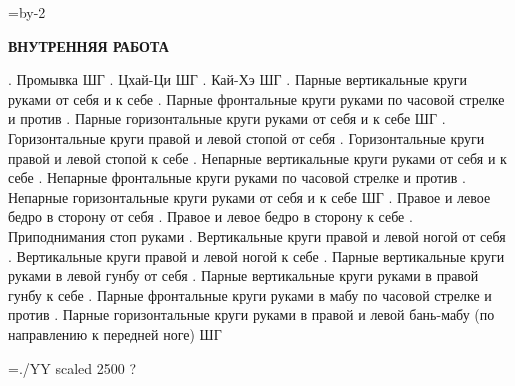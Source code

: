 \pdfhorigin=19mm \hsize=\pdfpagewidth \advance\hsize by-2\pdfhorigin
\nopagenumbers
\centerline{\bf ВНУТРЕННЯЯ РАБОТА}
\bigskip
\obeylines
\leavevmode{}. Промывка
ШГ
\leavevmode{}. Цхай-Ци
ШГ
\leavevmode{}. Кай-Хэ
ШГ
\leavevmode{}. Парные вертикальные круги руками от себя и к себе
\leavevmode{}. Парные фронтальные круги руками по часовой стрелке и против
\leavevmode{}. Парные горизонтальные круги руками от себя и к себе
ШГ
\leavevmode{}. Горизонтальные круги правой и левой стопой от себя
\leavevmode{}. Горизонтальные круги правой и левой стопой к себе
\leavevmode{}. Непарные вертикальные круги руками от себя и к себе
\leavevmode{}. Непарные фронтальные круги руками по часовой стрелке и против
\leavevmode{}. Непарные горизонтальные круги руками от себя и к себе
ШГ
\leavevmode{}. Правое и левое бедро в сторону от себя
\leavevmode{}. Правое и левое бедро в сторону к себе
\leavevmode{}. Приподнимания стоп руками
\leavevmode{}. Вертикальные круги правой и левой ногой от себя
\leavevmode{}. Вертикальные круги правой и левой ногой к себе
\leavevmode{}. Парные вертикальные круги руками в левой гунбу от себя
\leavevmode{}. Парные вертикальные круги руками в правой гунбу к себе
\leavevmode{}. Парные фронтальные круги руками в мабу по часовой стрелке и против
\leavevmode{}. Парные горизонтальные круги руками в правой и левой бань-мабу
\leavevmode\kern11pt (по направлению к передней ноге)
ШГ
\vfill
\centerline{\font\YY=./YY scaled 2500 \YY?}
\bye
